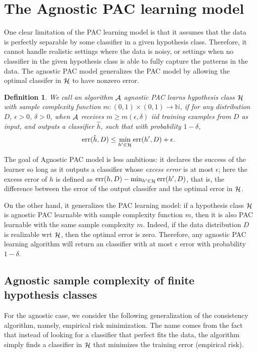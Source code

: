 \documentclass{article}
\newtheorem{definition}{Definition}
\DeclareMathOperator*{\err}{{\rm err}}
\DeclareMathOperator*{\Hcal}{{\cal H}}
\DeclareMathOperator*{\Acal}{{\cal A}}
\newcommand{\NN}{\mathbb{N}}
\begin{document}
\section{The Agnostic PAC learning model}

One clear limitation of the PAC learning model is that it assumes that the data is perfectly
separable by some classifier in a given hypothesis class.
Therefore, it cannot handle realistic settings
where the data is noisy, or settings when no classifier in the given hypothesis class is able to fully capture the patterns in the data. The agnostic PAC model generalizes the PAC
model by allowing the optimal classifer in $\Hcal$ to have nonzero error.

\begin{definition}
We call an algorithm $\Acal$ agnostic PAC learns hypothesis class $\Hcal$ with sample complexity
function $m: (0,1) \times (0,1) \to \NN$, if for any distribution $D$, $\epsilon > 0$, $\delta > 0$,
when $\Acal$ receives $m \geq m(\epsilon, \delta)$ iid training examples from $D$ as input,
 and outputs
a classifier $\hat{h}$, such that with probability $1-\delta$,
\[ \err(\hat{h}, D) \leq \min_{h' \in \Hcal} \err(h',D) + \epsilon. \]
\end{definition}

The goal of Agnostic PAC model is less ambitious: it declares the success of the learner so long as it outputs a classifier whose {\em excess error} is at most $\epsilon$; here the excess error of $h$ is defined as $\err(h, D) - \min_{h' \in \Hcal} \err(h',D)$, that is, the difference between the error of the output classifer and the optimal error in $\Hcal$.

On the other hand, it generalizes the PAC learning model: if a hypothesis class $\Hcal$ is agnostic PAC learnable with sample complexity function $m$, then it is also PAC learnable with the same sample complexity $m$. Indeed, if the data distribution $D$ is realizable wrt $\Hcal$, then the optimal error is zero. Therefore, any agnostic PAC learning algorithm will return an classifier with at most $\epsilon$ error with probability $1-\delta$.

\subsection{Agnostic sample complexity of finite hypothesis classes}

For the agnostic case, we consider the following generalization of the
consistency algorithm, namely, empirical risk minimization. The name comes
from the fact that instead of looking for a classifier that perfect fits the
data, the algorithm simply finds a classifier in $\Hcal$ that minimizes the
training error (empirical risk).
\end{document}
